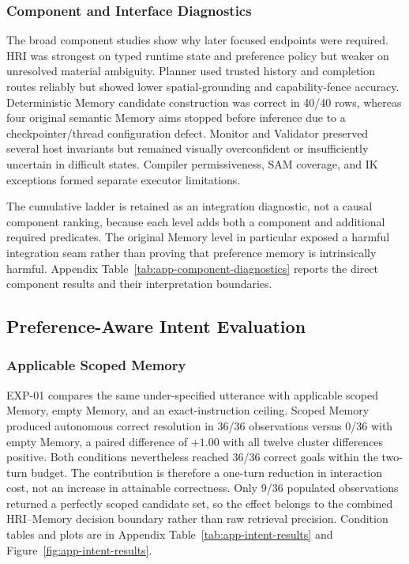 \documentclass{article}
\begin{document}
\subsubsection{Component and Interface Diagnostics}

The broad component studies show why later focused endpoints were required.
HRI was strongest on typed runtime state and preference policy but weaker on
unresolved material ambiguity. Planner used trusted history and completion
routes reliably but showed lower spatial-grounding and capability-fence
accuracy. Deterministic Memory candidate construction was correct in 40/40
rows, whereas four original semantic Memory aims stopped before inference due
to a checkpointer/thread configuration defect. Monitor and Validator preserved
several host invariants but remained visually overconfident or insufficiently
uncertain in difficult states. Compiler permissiveness, SAM coverage, and IK
exceptions formed separate executor limitations.

The cumulative ladder is retained as an integration diagnostic, not a causal
component ranking, because each level adds both a component and additional
required predicates. The original Memory level in particular exposed a harmful
integration seam rather than proving that preference memory is intrinsically
harmful. Appendix Table~\ref{tab:app-component-diagnostics} reports the direct
component results and their interpretation boundaries.

\subsection{Preference-Aware Intent Evaluation}
\label{subsec:evaluation-preference}

\subsubsection{Applicable Scoped Memory}

EXP-01 compares the same under-specified utterance with applicable scoped
Memory, empty Memory, and an exact-instruction ceiling. Scoped Memory produced
autonomous correct resolution in 36/36 observations versus 0/36 with empty
Memory, a paired difference of $+1.00$ with all twelve cluster differences
positive. Both conditions nevertheless reached 36/36 correct goals within the
two-turn budget. The contribution is therefore a one-turn reduction in
interaction cost, not an increase in attainable correctness. Only 9/36
populated observations returned a perfectly scoped candidate set, so the
effect belongs to the combined HRI--Memory decision boundary rather than raw
retrieval precision. Condition tables and plots are in Appendix
Table~\ref{tab:app-intent-results} and
Figure~\ref{fig:app-intent-results}.
\end{document}
